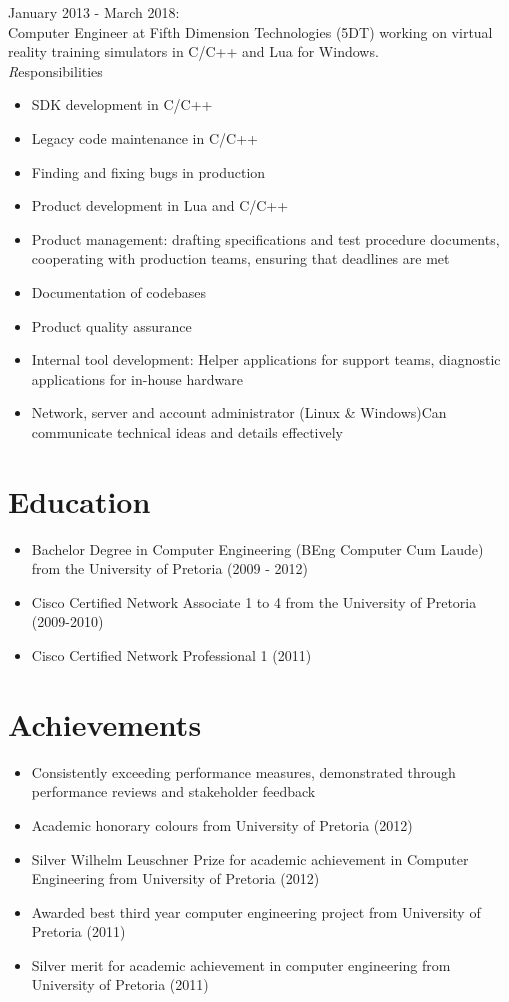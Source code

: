 \documentclass[11pt,a4paper]{article}
\begin{document}
{\noindent\large January 2013 - March 2018:}\\

	Computer Engineer at Fifth Dimension Technologies (5DT) working on virtual reality training simulators in C/C++ and Lua for Windows.\\

	
	{\emph Responsibilities}
	\begin{itemize}
		\item SDK development in C/C++
		\item Legacy code maintenance in C/C++
		\item Finding and fixing bugs in production
		\item Product development in Lua and C/C++
		\item Product management: drafting specifications and test procedure documents, cooperating with production teams, ensuring that deadlines are met 
		\item Documentation of codebases
		\item Product quality assurance		
		\item Internal tool development: Helper applications for support teams, diagnostic applications for in-house hardware 
		\item Network, server and account administrator (Linux \& Windows)Can communicate technical ideas and details effectively
	\end{itemize}

\section*{Education}
\begin{itemize}
	\item Bachelor Degree in Computer Engineering (BEng Computer Cum Laude) from the University of Pretoria (2009 - 2012) 
	\item Cisco Certified Network Associate 1 to 4 from the University of Pretoria (2009-2010)
	\item Cisco Certified Network Professional 1 (2011)

\end{itemize}	
	
\section*{Achievements}
\begin{itemize}
	\item Consistently exceeding performance measures, demonstrated through performance reviews and stakeholder feedback 
	\item Academic honorary colours from University of Pretoria (2012)
	\item Silver Wilhelm Leuschner Prize for academic achievement in Computer Engineering from University of Pretoria (2012) 
	\item Awarded best third year computer engineering project from University of Pretoria (2011) 
	\item Silver merit for academic achievement in computer engineering from University of Pretoria (2011) 
\end{itemize} 
\end{document}
